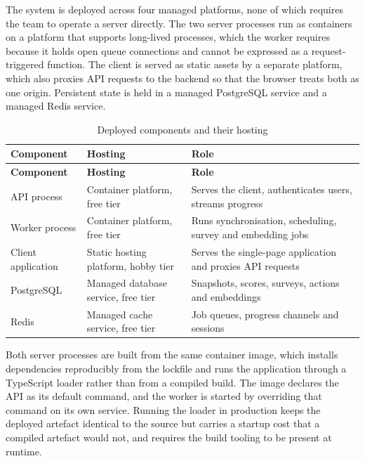 The system is deployed across four managed platforms, none of which requires the
team to operate a server directly. The two server processes run as containers on
a platform that supports long-lived processes, which the worker requires because
it holds open queue connections and cannot be expressed as a request-triggered
function. The client is served as static assets by a separate platform, which
also proxies API requests to the backend so that the browser treats both as one
origin. Persistent state is held in a managed PostgreSQL service and a managed
Redis service.

\begin{longtable}{
  >{\raggedright\arraybackslash}p{}
  >{\raggedright\arraybackslash}p{}
  >{\raggedright\arraybackslash}p{}
}
\caption{Deployed components and their hosting}
\label{tab:deployment}\\
\toprule
\textbf{Component} & \textbf{Hosting} & \textbf{Role} \\
\midrule
\endfirsthead
\toprule
\textbf{Component} & \textbf{Hosting} & \textbf{Role} \\
\midrule
\endhead
\bottomrule
\endlastfoot
API process & Container platform, free tier & Serves the client, authenticates users,
streams progress \\
Worker process & Container platform, free tier & Runs synchronisation, scheduling,
survey and embedding jobs \\
Client application & Static hosting platform, hobby tier & Serves the single-page
application and proxies API requests \\
PostgreSQL & Managed database service, free tier & Snapshots, scores, surveys,
actions and embeddings \\
Redis & Managed cache service, free tier & Job queues, progress channels and sessions
\\
\end{longtable}

Both server processes are built from the same container image, which installs
dependencies reproducibly from the lockfile and runs the application through a
TypeScript loader rather than from a compiled build. The image declares the API
as its default command, and the worker is started by overriding that command on
its own service. Running the loader in production keeps the deployed artefact
identical to the source but carries a startup cost that a compiled artefact would
not, and requires the build tooling to be present at runtime.

